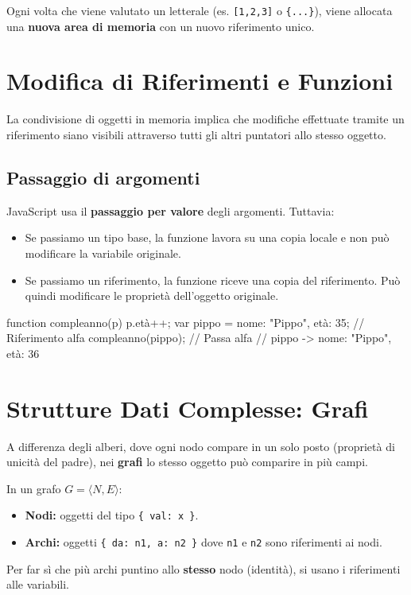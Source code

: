 \begin{labconcept}
Ogni volta che viene valutato un letterale (es. \texttt{[1,2,3]} o \texttt{\{...\}}), viene allocata una \textbf{nuova area di memoria} con un nuovo riferimento unico.
\end{labconcept}

\section{Modifica di Riferimenti e Funzioni}
La condivisione di oggetti in memoria implica che modifiche effettuate tramite un riferimento siano visibili attraverso tutti gli altri puntatori allo stesso oggetto.

\subsection{Passaggio di argomenti}
JavaScript usa il \textbf{passaggio per valore} degli argomenti. Tuttavia:
\begin{itemize}
    \item Se passiamo un tipo base, la funzione lavora su una copia locale e non può modificare la variabile originale.
    \item Se passiamo un riferimento, la funzione riceve una copia del riferimento. Può quindi modificare le proprietà dell'oggetto originale.
\end{itemize}

\begin{labjsbox}
function compleanno(p) { p.età++; }
var pippo = {nome: "Pippo", età: 35}; // Riferimento alfa
compleanno(pippo); // Passa alfa
// pippo -> {nome: "Pippo", età: 36}
\end{labjsbox}

\section{Strutture Dati Complesse: Grafi}
A differenza degli alberi, dove ogni nodo compare in un solo posto (proprietà di unicità del padre), nei \textbf{grafi} lo stesso oggetto può comparire in più campi.

\begin{labdefinition}
In un grafo $G = \langle N, E \rangle$:
\begin{itemize}
    \item \textbf{Nodi:} oggetti del tipo \texttt{\{ val: x \}}.
    \item \textbf{Archi:} oggetti \texttt{\{ da: n1, a: n2 \}} dove \texttt{n1} e \texttt{n2} sono riferimenti ai nodi.
\end{itemize}
Per far sì che più archi puntino allo \textbf{stesso} nodo (identità), si usano i riferimenti alle variabili.
\end{labdefinition}


